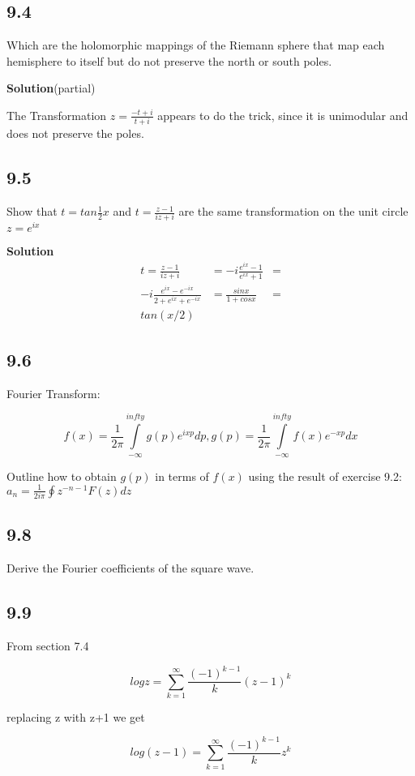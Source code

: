 \documentclass[]{article}
\begin{document}
\subsection*{9.4}
Which are the holomorphic mappings of the Riemann sphere that map each hemisphere to itself but do not preserve the north or south poles.

\textbf{Solution}(partial)

The Transformation $z = \frac{-t+i}{t+i}$ appears to do the trick, since it is unimodular and does not preserve the poles. 

\subsection*{9.5}
Show that $t = tan\frac{1}{2}x$ and $t = \frac{z-1}{iz+i}$ are the same transformation
on the unit circle $z = e^{ix}$

\textbf{Solution}
\begin{eqnarray}
t = \frac{z-1}{iz+i} &= -i\frac{e^{ix}-1}{e^{ix}+1} &= \\
-i\frac{e^{ix}-e^{-ix}}{2+e^{ix}+e^{-ix}} &= \frac{sinx}{1+cosx} &= \\
tan(x/2)
\end{eqnarray}

\subsection*{9.6}
Fourier Transform:

$$
f(x) = \frac{1}{2\pi} \int\limits_{-\infty}^{infty} g(p)e^{ixp}dp,
g(p) = \frac{1}{2\pi} \int\limits_{-\infty}^{infty} f(x)e^{-xp}dx
$$

Outline how to obtain $g(p)$ in terms of $f(x)$ using the result of exercise 9.2: 
$a_n = \frac{1}{2i\pi}\oint z^{-n-1}F(z)dz$

\subsection*{9.8}
Derive the Fourier coefficients of the square wave. 

\subsection*{9.9}
From section 7.4

$$
logz = \sum_{k=1}^{\infty} \frac{(-1)^{k-1}}{k}(z-1)^k
$$

replacing z with z+1 we get

$$
log(z-1) = \sum_{k=1}^{\infty} \frac{(-1)^{k-1}}{k}z^k
$$
\end{document}
